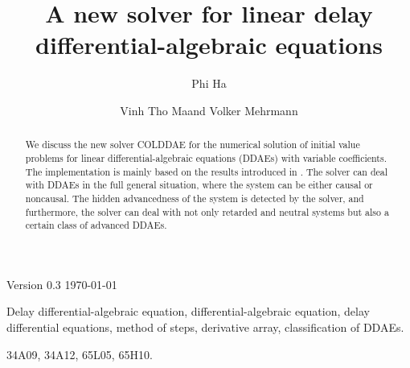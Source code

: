 \documentclass[final,reqno]{siamltex}
\begin{document}
\title{A new solver for linear delay differential-algebraic equations\footnotemark[1]}

\author{Phi Ha\footnotemark[2] \and Vinh Tho Ma\footnotemark[2] and Volker Mehrmann\footnotemark[2]}

\renewcommand{\thefootnote}{\fnsymbol{footnote}}


\maketitle

\newcommand{\thedate}{Version 0.3 \quad \today}

\begin{center}
\thedate
\end{center}

\vskip 0.2cm

\begin{abstract}
We discuss the new solver COLDDAE for the numerical solution of initial value problems for linear differential-algebraic equations (DDAEs) with variable coefficients. The implementation is mainly 
based on the results introduced in \cite{HaM14}. The solver can deal with DDAEs in the full general situation, where the system can be either causal or noncausal. 
The hidden advancedness of the system is detected by the solver, and furthermore, the solver can deal with not only retarded and neutral systems but also a certain class of advanced DDAEs.
\end{abstract}

\begin{keywords} Delay differential-algebraic equation, differential-algebraic equation, delay differential equations, method of steps, derivative array, classification of DDAEs.
\end{keywords}

\begin{AMS}
34A09, 34A12, 65L05, 65H10.
\end{AMS}

\pagestyle{myheadings}
\thispagestyle{plain}
\end{document}
